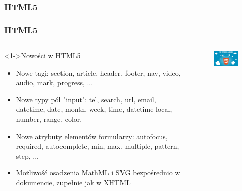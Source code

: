 \documentclass{beamer}
\begin{document}
\subsubsection{HTML5}
\begin{frame}
\frametitle{HTML5}


\begin{columns}[T] %
      
     \begin{column}[T]{7cm} %
    \begin{block}<1->{Nowości w HTML5 }
 
\begin{itemize}
\item  Nowe tagi: section, article, header, footer, nav, video, audio, mark, progress, ...\\
\item Nowe typy pól "input": tel, search, url, email, datetime, date, month, week, time, datetime-local, number, range, color.
\item Nowe atrybuty elementów formularzy: autofocus, required, autocomplete, min, max, multiple, pattern, step, ...
\item Możliwość osadzenia MathML i SVG bezpośrednio w dokumencie, zupełnie jak w XHTML


\end{itemize}
\end{block}
     \end{column}
     \begin{column}[Tc]{5cm} %
     \begin{figure}[!ht]

  \centering
  \includegraphics[width=5cm]{html5.png}
\end{figure}
          
     \end{column}
     \end{columns}
     
     
     
 
\end{frame}
\end{document}
